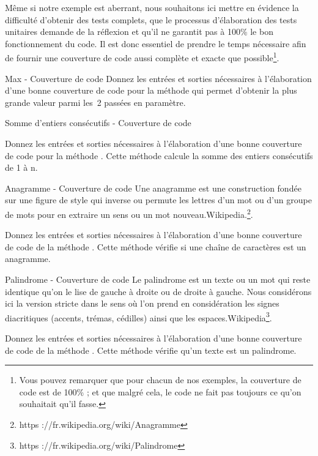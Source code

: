 \documentclass[a4paper,11pt]{style-esi/td}
\begin{document}
	Même si notre exemple est aberrant, nous souhaitons ici mettre en évidence la difficulté d'obtenir des tests complets, que le processus d’élaboration des tests unitaires demande de la réflexion et qu’il ne garantit pas à 100\% le bon fonctionnement du code. Il est donc essentiel de prendre le temps nécessaire afin de fournir une couverture de code aussi complète et exacte que possible\footnote{Vous pouvez remarquer que pour chacun de nos exemples, la couverture de code est de 100\% ; et que malgré cela, le code ne fait pas toujours ce qu'on souhaitait qu'il fasse.}.

	\begin{Exercice}{Max - Couverture de code}
		Donnez les entrées et sorties nécessaires à l’élaboration d’une bonne couverture de code pour la méthode  qui permet d’obtenir la plus grande valeur parmi les~2 passées en paramètre.
	\end{Exercice}

	\begin{Exercice}{Somme d'entiers consécutifs - Couverture de code}
		
		Donnez les entrées et sorties nécessaires à l’élaboration d’une bonne couverture de code pour la méthode . Cette méthode calcule la somme des entiers consécutifs de 1 à n.
	\end{Exercice}

	\begin{Exercice}{Anagramme - Couverture de code}
		\og Une anagramme est une construction fondée sur une figure de style qui inverse ou permute les lettres d’un mot ou d’un groupe de mots pour en extraire un sens ou un mot nouveau.\fg Wikipedia.\footnote{https ://fr.wikipedia.org/wiki/Anagramme}. 

		Donnez les entrées et sorties nécessaires à l’élaboration d’une bonne couverture de code de la méthode . Cette méthode vérifie si une chaîne de caractères est un anagramme.
	\end{Exercice}

	\begin{Exercice}{Palindrome - Couverture de code}
		\og Le palindrome est un texte ou un mot qui reste identique qu’on le lise de gauche à droite ou de droite à gauche. Nous considérons ici la version stricte dans le sens où l’on prend en considération les signes diacritiques (accents, trémas, cédilles) ainsi que les espaces.\fg Wikipedia\footnote{https ://fr.wikipedia.org/wiki/Palindrome}.

		Donnez les entrées et sorties nécessaires à l’élaboration d’une bonne couverture de code de la méthode . Cette méthode vérifie qu'un texte est un palindrome.
	\end{Exercice}
\end{document}
